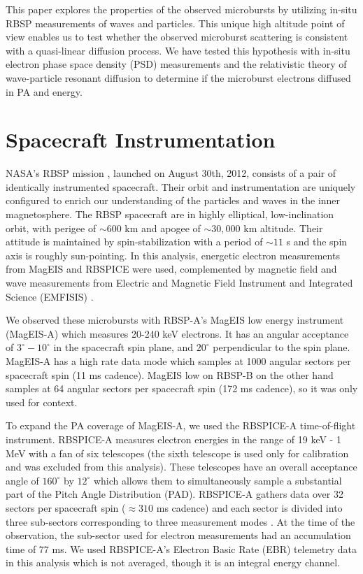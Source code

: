 This paper explores the properties of the observed microbursts by utilizing in-situ RBSP measurements of waves and particles. This unique high altitude point of view enables us to test whether the observed microburst scattering is consistent with a quasi-linear diffusion process. We have tested this hypothesis with in-situ electron phase space density (PSD) measurements and the relativistic theory of wave-particle resonant diffusion \citep{Walker1993, Summers1998} to determine if the microburst electrons diffused in PA and energy.

\section{Spacecraft Instrumentation} \label{sc} %
NASA's RBSP mission \citep{Mauk2013}, launched on August 30th, 2012, consists of a pair of identically instrumented spacecraft. Their orbit and instrumentation are uniquely configured to enrich our understanding of the particles and waves in the inner magnetosphere. The RBSP spacecraft are in highly elliptical, low-inclination orbit, with perigee of ${\sim}600$ km and apogee of ${\sim}30,000$ km altitude. Their attitude is maintained by spin-stabilization with a period of ${\sim}11$ s and the spin axis is roughly sun-pointing. In this analysis, energetic electron measurements from MagEIS \citep{Blake2013} and RBSPICE \citep{Mitchell2013} were used, complemented by magnetic field and wave measurements from Electric and Magnetic Field Instrument and Integrated Science (EMFISIS) \citep{Kletzing2013}.

We observed these microbursts with RBSP-A's MagEIS low energy instrument (MagEIS-A) which measures 20-240 keV electrons. It has an angular acceptance of $3^\circ - 10^\circ$ in the spacecraft spin plane, and $20^\circ$ perpendicular to the spin plane. MagEIS-A has a high rate data mode which samples at 1000 angular sectors per spacecraft spin (11 ms cadence). MagEIS low on RBSP-B on the other hand samples at 64 angular sectors per spacecraft spin (172 ms cadence), so it was only used for context.

To expand the PA coverage of MagEIS-A, we used the RBSPICE-A time-of-flight instrument. RBSPICE-A measures electron energies in the range of 19 keV - 1 MeV with a fan of six telescopes (the sixth telescope is used only for calibration and was excluded from this analysis). These telescopes have an overall acceptance angle of $160^\circ$ by $12^\circ$ which allows them to simultaneously sample a substantial part of the Pitch Angle Distribution (PAD). RBSPICE-A gathers data over 32 sectors per spacecraft spin ($\approx 310$ ms cadence) and each sector is divided into three sub-sectors corresponding to three measurement modes \citep{Manweiler2018}. At the time of the observation, the sub-sector used for electron measurements had an accumulation time of $77$ ms. We used RBSPICE-A's Electron Basic Rate (EBR) telemetry data in this analysis which is not averaged, though it is an integral energy channel.

